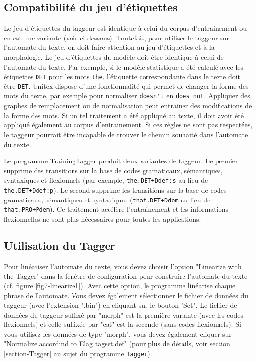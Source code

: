 \subsection{Compatibilité du jeu d'étiquettes}
\label{section-linearization-tagset}

Le jeu d'étiquettes du taggeur est identique à celui du corpus d'entrainement ou en est une variante
(voir ci-dessous). Toutefois, pour utiliser le taggeur sur l'automate du texte, on doit faire
attention au jeu d'étiquettes et à la morphologie. Le jeu d'étiquettes du modèle doit être identique
à celui de l'automate du texte. Par exemple, si le modèle statistique a été calculé avec les
étiquettes \verb+DET+ pour les mots \verb+the+, l'étiquette correspondante dans le texte doit être
\verb+DET+. Unitex dispose d'une fonctionnalité qui permet de changer la forme des mots du texte, par
exemple pour normaliser \verb+doesn't+ en \verb+does not+. Appliquer des graphes de remplacement ou
de normalisation peut entrainer des modifications de la forme des mots. Si un tel traitement a été
appliqué au texte, il doit avoir été appliqué également au corpus d'entrainement. Si ces règles ne
sont pas respectées, le taggeur pourrait être incapable de trouver le chemin souhaité dans
l'automate du texte.

\bigskip
\noindent Le programme TrainingTagger produit deux variantes de taggeur. Le premier supprime des
transitions sur la base de codes gramaticaux, sémantiques, syntaxiques et flexionnels
(par exemple, \verb$the.DET+Ddef:s$ au lieu de \verb$the.DET+Ddef:p$). 
Le second supprime les transitions sur la base de codes gramaticaux, sémantiques et syntaxiques
(\verb$that.DET+Ddem$ au lieu de \verb$that.PRO+Pdem$). Ce traitement accélère l'entrainement et les
informations flexionnelles ne sont plus nécessaires pour toutes les
applications.

\subsection{Utilisation du Tagger}
Pour linéariser l'automate du texte, vous devez choisir l'option "Linearize with the Tagger" dans la
fenêtre de configuration pour construire l'automate du texte (cf. figure \ref{fig7-linearize1}).
Avec cette option, le programme linéarise chaque phrase de l'automate. Vous devez également
sélectionner le fichier de données du taggeur (avec l'extension ".bin") en cliquant sur le bouton
"Set". Le fichier de données du taggeur suffixé par "morph" est la première variante (avec les codes
flexionnels) et celle suffixée par "cat" est la seconde (sans codes flexionnels). Si vous utilisez
les données de type "morph", vous devez également cliquer sur "Normalize accordind to Elag
tagset.def" (pour plus de  détails, voir section \ref{section-Tagger} au sujet du programme
\verb+Tagger+).


